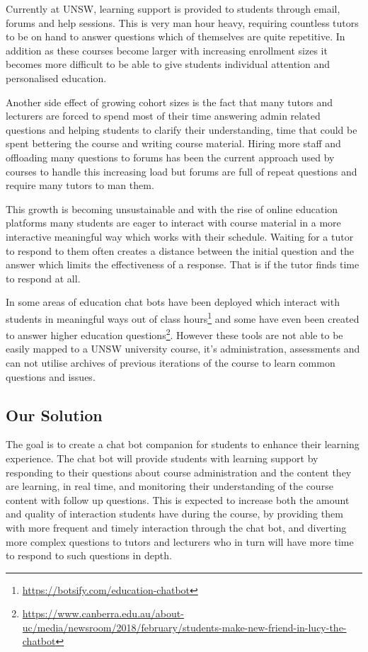 \documentclass{article}
\begin{document}
Currently at UNSW, learning support is provided to students through email, forums and help sessions. This is very man hour heavy, requiring countless tutors to be on hand to answer questions which of themselves are quite repetitive. In addition as these courses become larger with increasing enrollment sizes it becomes more difficult to be able to give students individual attention and personalised education. 

Another side effect of growing cohort sizes is the fact that many tutors and lecturers are forced to spend most of their time answering admin related questions and helping students to clarify their understanding, time that could be spent bettering the course and writing course material. Hiring more staff and offloading many questions to forums has been the current approach used by courses to handle this increasing load but forums are full of repeat questions and require many tutors to man them. 

This growth is becoming unsustainable and with the rise of online education platforms many students are eager to interact with course material in a more interactive meaningful way which works with their schedule. Waiting for a tutor to respond to them often creates a distance between the initial question and the answer which limits the effectiveness of a response. That is if the tutor finds time to respond at all. 

In some areas of education chat bots have been deployed which interact with students in meaningful ways out of class hours\footnote{\url{https://botsify.com/education-chatbot}} and some have even been created to answer higher education questions\footnote{\url{https://www.canberra.edu.au/about-uc/media/newsroom/2018/february/students-make-new-friend-in-lucy-the-chatbot}}. However these tools are not able to be easily mapped to a UNSW university course, it's administration, assessments and can not utilise archives of previous iterations of the course to learn common questions and issues.


\subsection{Our Solution}

The goal is to create a chat bot companion for students to enhance their learning experience. The chat bot will provide students with learning support by responding to their questions about course administration and the content they are learning, in real time, and monitoring their understanding of the course content with follow up questions. This is expected to increase both the amount and quality of interaction students have during the course, by providing them with more frequent and timely interaction through the chat bot, and diverting more complex questions to tutors and lecturers who in turn will have more time to respond to such questions in depth. 
\end{document}
